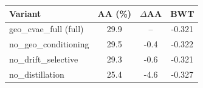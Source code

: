 \begin{tabular}{lccc}
\toprule
\textbf{Variant} & \textbf{AA (\%)} & \textbf{$\Delta$AA} & \textbf{BWT} \\
\midrule
geo_cvae_full (full) & 29.9 & -- & -0.321 \\
no_geo_conditioning & 29.5 & -0.4 & -0.322 \\
no_drift_selective & 29.3 & -0.6 & -0.321 \\
no_distillation & 25.4 & -4.6 & -0.327 \\
\bottomrule
\end{tabular}